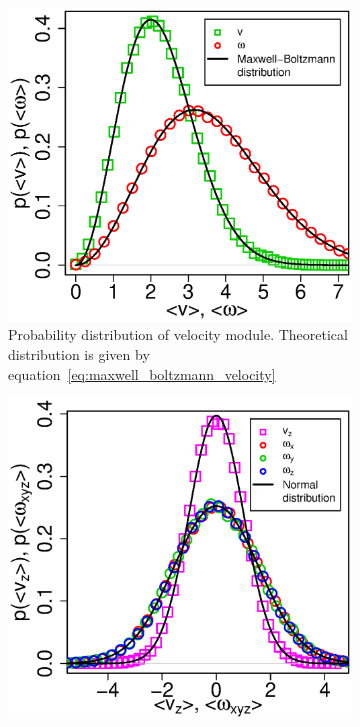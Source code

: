 \begin{figure}[h]
\centering
	\begin{subfigure}[t]{0.45\textwidth}
		\centering
		\includegraphics[width=\textwidth]{Images/DiffusionStats_mb}
		\captionsetup{justification=centering, width=0.9\textwidth}
		\caption{Probability distribution of velocity module. Theoretical distribution is given by equation~\eqref{eq:maxwell_boltzmann_velocity}}
	\end{subfigure}
	\begin{subfigure}[t]{0.45\textwidth}
		\centering
		\includegraphics[width=\textwidth]{Images/DiffusionStats_norm}

\end{subfigure}
\end{figure}
